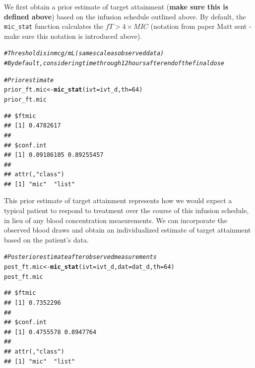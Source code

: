 \documentclass{article}\usepackage[]{graphicx}\usepackage[]{color}
\makeatletter
\newcommand{\hlnum}[1]{\textcolor[rgb]{0.686,0.059,0.569}{#1}}%
\newcommand{\hlcom}[1]{\textcolor[rgb]{0.678,0.584,0.686}{\textit{#1}}}%
\newcommand{\hlstd}[1]{\textcolor[rgb]{0.345,0.345,0.345}{#1}}%
\newcommand{\hlkwb}[1]{\textcolor[rgb]{0.69,0.353,0.396}{#1}}%
\newcommand{\hlkwc}[1]{\textcolor[rgb]{0.333,0.667,0.333}{#1}}%
\newcommand{\hlkwd}[1]{\textcolor[rgb]{0.737,0.353,0.396}{\textbf{#1}}}%
\newenvironment{kframe}{%
 \def\at@end@of@kframe{}%
 \ifinner\ifhmode%
  \def\at@end@of@kframe{\end{minipage}}%
  \begin{minipage}{\columnwidth}%
 \fi\fi%
 \def\FrameCommand##1{\hskip\@totalleftmargin \hskip-\fboxsep
 \colorbox{shadecolor}{##1}\hskip-\fboxsep
     \hskip-\linewidth \hskip-\@totalleftmargin \hskip\columnwidth}%
 \MakeFramed {\advance\hsize-\width
   \@totalleftmargin\z@ \linewidth\hsize
   \@setminipage}}%
 {\par\unskip\endMakeFramed%
 \at@end@of@kframe}
\newenvironment{knitrout}{}{} %
\makeatother
\begin{document}
We first obtain a prior estimate of target attainment ({\bf make sure this is defined above}) based on the infusion schedule outlined above. By default, the \texttt{mic\_stat} function calculates the $fT > 4 \times MIC$ (notation from paper Matt sent - make sure this notation is introduced above).
\begin{knitrout}
\color{fgcolor}\begin{kframe}
\begin{alltt}
\hlcom{# Threshold is in mcg/mL (same scale as observed data)}
\hlcom{# By default, considering time through 12 hours after end of the final dose}

\hlcom{# Prior estimate}
\hlstd{prior_ft.mic} \hlkwb{<-} \hlkwd{mic_stat}\hlstd{(}\hlkwc{ivt} \hlstd{= ivt_d,} \hlkwc{th} \hlstd{=} \hlnum{64}\hlstd{)}
\hlstd{prior_ft.mic}
\end{alltt}
\begin{verbatim}
## $ftmic
## [1] 0.4782617
## 
## $conf.int
## [1] 0.09186105 0.89255457
## 
## attr(,"class")
## [1] "mic"  "list"
\end{verbatim}
\end{kframe}
\end{knitrout}

This prior estimate of target attainment represents how we would expect a typical patient to respond to treatment over the course of this infusion schedule, in lieu of any blood concentration measurements. We can incorporate the observed blood draws and obtain an individualized estimate of target attainment based on the patient's data.

\begin{knitrout}
\color{fgcolor}\begin{kframe}
\begin{alltt}
\hlcom{# Posterior estimate after observed measurements}
\hlstd{post_ft.mic} \hlkwb{<-} \hlkwd{mic_stat}\hlstd{(}\hlkwc{ivt} \hlstd{= ivt_d,} \hlkwc{dat} \hlstd{= dat_d,} \hlkwc{th} \hlstd{=} \hlnum{64}\hlstd{)}
\hlstd{post_ft.mic}
\end{alltt}
\begin{verbatim}
## $ftmic
## [1] 0.7352296
## 
## $conf.int
## [1] 0.4755578 0.8947764
## 
## attr(,"class")
## [1] "mic"  "list"
\end{verbatim}
\end{kframe}
\end{knitrout}
\end{document}
